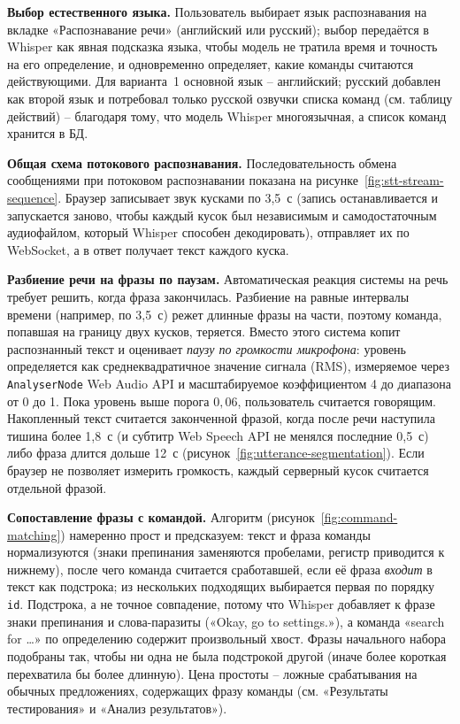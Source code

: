 \textbf{Выбор естественного языка.} Пользователь выбирает язык
распознавания на вкладке «Распознавание речи» (английский или
русский); выбор передаётся в Whisper как явная подсказка языка,
чтобы модель не тратила время и точность на его определение, и
одновременно определяет, какие команды считаются действующими. Для
варианта~1 основной язык -- английский; русский добавлен как второй
язык и потребовал только русской озвучки списка команд (см. таблицу
действий) -- благодаря тому, что модель Whisper многоязычная, а список
команд хранится в БД.


\textbf{Общая схема потокового распознавания.} Последовательность
обмена сообщениями при потоковом распознавании показана на
рисунке~\ref{fig:stt-stream-sequence}. Браузер записывает звук
кусками по 3{,}5~с (запись останавливается и запускается заново, чтобы
каждый кусок был независимым и самодостаточным аудиофайлом, который
Whisper способен декодировать), отправляет их по WebSocket, а в ответ
получает текст каждого куска.


\textbf{Разбиение речи на фразы по паузам.} Автоматическая реакция
системы на речь требует решить, когда фраза закончилась. Разбиение на
равные интервалы времени (например, по 3{,}5~с) режет длинные фразы на
части, поэтому команда, попавшая на границу двух кусков, теряется.
Вместо этого система копит распознанный текст и оценивает
\emph{паузу по громкости микрофона}: уровень определяется как
среднеквадратичное значение сигнала (RMS), измеряемое через
\texttt{AnalyserNode} Web Audio API и масштабируемое коэффициентом 4 до
диапазона от 0 до 1. Пока уровень выше порога $0{,}06$, пользователь
считается говорящим. Накопленный текст считается законченной фразой,
когда после речи наступила тишина более 1{,}8~с (и субтитр Web Speech API
не менялся последние 0{,}5~с) либо фраза длится дольше 12~с
(рисунок~\ref{fig:utterance-segmentation}). Если браузер не позволяет
измерить громкость, каждый серверный кусок считается отдельной
фразой.


\textbf{Сопоставление фразы с командой.} Алгоритм
(рисунок~\ref{fig:command-matching}) намеренно прост и предсказуем:
текст и фраза команды нормализуются (знаки препинания заменяются
пробелами, регистр приводится к нижнему), после чего команда
считается сработавшей, если её фраза \emph{входит} в текст как
подстрока; из нескольких подходящих выбирается первая по порядку
\texttt{id}. Подстрока, а не точное совпадение, потому что Whisper
добавляет к фразе знаки препинания и слова-паразиты («Okay, go to
settings.»), а команда «search for \ldots» по определению содержит
произвольный хвост. Фразы начального набора подобраны так, чтобы ни одна
не была подстрокой другой (иначе более короткая перехватила бы более
длинную). Цена простоты -- ложные срабатывания на обычных предложениях,
содержащих фразу команды (см. «Результаты тестирования» и «Анализ
результатов»).

